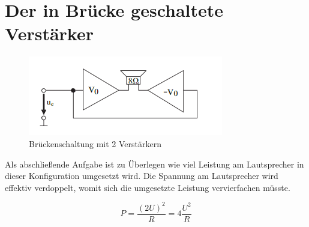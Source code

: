 \section{Der in Brücke geschaltete Verstärker}

\begin{figure}[H]
    \centering
    \includegraphics{tex/7_Leistungsverstaerker/pictures/Bridgeamp.png}
    \caption{Brückenschaltung mit 2 Verstärkern}
    \label{fig:my_label}
\end{figure}

Als abschließende Aufgabe ist zu Überlegen wie viel Leistung am Lautsprecher in dieser Konfiguration umgesetzt wird. Die Spannung am Lautsprecher wird effektiv verdoppelt, womit sich die umgesetzte Leistung vervierfachen müsste. 

\begin{equation*}
    P = \frac{(2 U)^2}{R} = 4 \frac{U^2}{R}
\end{equation*}